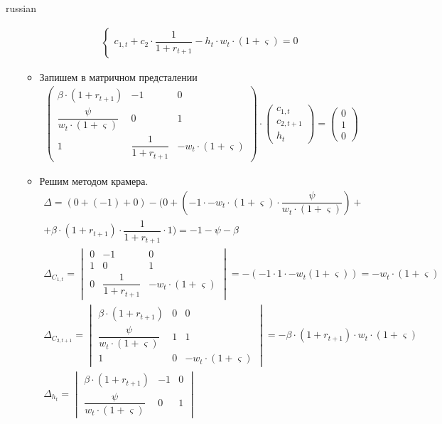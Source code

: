 \documentclass[fleqn]{article}
\begin{document}
\begin{otherlanguage*}{russian}
\begin{enumerate}[label=\alph*), leftmargin=*]
\begin{itemize}
\begin{align}
\begin{cases}
c_{1, t} + c_2 \cdot \dfrac{1}{1 + r_{t+1}} - h_t \cdot w_t \cdot (1 + \varsigma) = 0 
\end{cases} 	
\end{align}
\item Запишем в матричном предсталении
\begin{align*}
\begin{pmatrix}
\beta \cdot (1 + r_{t+1}) & -1 & 0
\\
\dfrac{\psi}{w_t \cdot (1 + \varsigma)} & 0 & 1 
\\
1 & \dfrac{1}{1 + r_{t+1}} & - w_t \cdot (1 + \varsigma) 
\end{pmatrix}  
\cdot 
\begin{pmatrix}
c_{1, t} \\ c_{2, t+1} \\ h_t 
\end{pmatrix}
= 
\begin{pmatrix}
0 \\ 1 \\ 0 
\end{pmatrix}
\end{align*}
\item Решим методом крамера. 
\begin{align*}
\Delta = (0 + (-1) + 0) - (0 + (-1 \cdot -w_t \cdot (1 + \varsigma) \cdot \dfrac{\psi}{w_t \cdot (1 + \varsigma)}) + \\
+ \beta \cdot (1 + r_{t+1}) \cdot \dfrac{1}{1 + r_{t+1}} \cdot 1) = -1 - \psi - \beta \\
\Delta_{C_{1, t}} = 
\begin{vmatrix}
0 & -1 & 0
\\
1  & 0 & 1 
\\
0 & \dfrac{1}{1 + r_{t+1}} & - w_t \cdot (1 + \varsigma) 
\end{vmatrix} 
= - ( -1 \cdot 1 \cdot -w_t (1 + \varsigma) ) = - w_t \cdot (1 + \varsigma) \\
\Delta_{C_{2, t+1}} = 
\begin{vmatrix}
\beta \cdot (1 + r_{t+1}) & 0 & 0
\\
\dfrac{\psi}{w_t \cdot (1 + \varsigma)} & 1 & 1 
\\
1 & 0 & - w_t \cdot (1 + \varsigma) 
\end{vmatrix} = - \beta \cdot (1 + r_{t+1}) \cdot w_t \cdot (1 + \varsigma) \\
\Delta_{h_t} = 
\begin{vmatrix}
\beta \cdot (1 + r_{t+1}) & -1 & 0
\\
\dfrac{\psi}{w_t \cdot (1 + \varsigma)} & 0 & 1 

\end{vmatrix}
\end{align*}
\end{itemize}
\end{enumerate}
\end{otherlanguage*}
\end{document}
